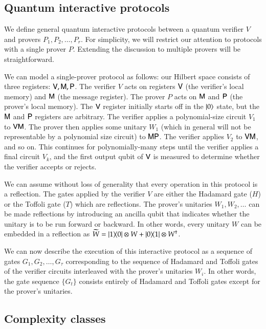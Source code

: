 \subsection{Quantum interactive protocols} 

We define general quantum interactive protocols between a quantum verifier $V$ and provers $P_1,P_2,\ldots,P_r$. For simplicity, we will restrict our attention to protocols with a single prover $P$. Extending the discussion to multiple provers will be straightforward. 

We can model a single-prover protocol as follows: our Hilbert space consists of three registers: ${\mathsf{V}}, {\mathsf{M}}, {\mathsf{P}}$. The verifier $V$ acts on registers ${\mathsf{V}}$ (the verifier's local memory) and ${\mathsf{M}}$ (the message register). The prover $P$ acts on ${\mathsf{M}}$ and ${\mathsf{P}}$ (the prover's local memory). The ${\mathsf{V}}$ register initially starts off in the $|0\rangle$ state, but the ${\mathsf{M}}$ and ${\mathsf{P}}$ registers are arbitrary. The verifier applies a polynomial-size circuit $V_1$ to ${\mathsf{V}} {\mathsf{M}}$. The prover then applies some unitary $W_1$ (which in general will not be representable by a polynomial size circuit) to ${\mathsf{M}} {\mathsf{P}}$. The verifier applies $V_2$ to ${\mathsf{V}} {\mathsf{M}}$, and so on. This continues for polynomially-many steps until the verifier applies a final circuit $V_k$, and the first output qubit of ${\mathsf{V}}$ is measured to determine whether the verifier accepts or rejects.


We can assume without loss of generality that every operation in this protocol is a reflection. The gates applied by the verifier $V$ are either the Hadamard gate ($H$) or the Toffoli gate ($T$) which are reflections. The prover's unitaries $W_1, W_2,\ldots$ can be made reflections by introducing an ancilla qubit that indicates whether the unitary is to be run forward or backward. In other words, every unitary $W$ can be embedded in a reflection as $\widetilde{W} = |1\rangle\! \langle 0| \otimes W + |0\rangle\! \langle 1| \otimes W^\dagger$. 

We can now describe the execution of this interactive protocol as a sequence of gates $G_1,G_2,\ldots,G_\tau$ corresponding to the sequence of Hadamard and Toffoli gates of the verifier circuits interleaved with the prover's unitaries $W_i$. In other words, the gate sequence $\{G_t\}$ consists entirely of Hadamard and Toffoli gates except for the prover's unitaries. %

\subsection{Complexity classes}

